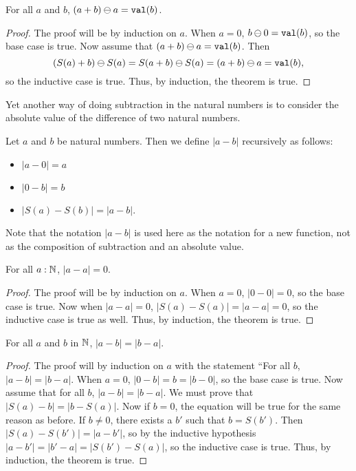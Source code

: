 \documentclass[../../math.tex]{subfiles}
\begin{document}
\begin{theorem} \label{nat_minus_plus}
    For all $a$ and $b$, $(a + b) \ominus a = \val b$.
\end{theorem}
\begin{proof}
    The proof will be by induction on $a$.  When $a = 0$, $b \ominus 0 = \val
    b$, so the base case is true.  Now assume that $(a + b) \ominus a = \val b$.
    Then
    \[
        (S(a) + b) \ominus S(a) = S(a + b) \ominus S(a) = (a + b) \ominus a =
        \val b,
    \]
    so the inductive case is true.  Thus, by induction, the theorem is true.
\end{proof}

Yet another way of doing subtraction in the natural numbers is to consider the
absolute value of the difference of two natural numbers.

\begin{definition}
    Let $a$ and $b$ be natural numbers.  Then we define $|a - b|$ recursively as
    follows:
    \begin{itemize}
        \item $|a - 0| = a$
        \item $|0 - b| = b$
        \item $|S(a) - S(b)| = |a - b|$.
    \end{itemize}
    Note that the notation $|a - b|$ is used here as the notation for a new
    function, not as the composition of subtraction and an absolute value.
\end{definition}

\begin{theorem}
    For all $a : \mathbb{N}$, $|a - a| = 0$.
\end{theorem}
\begin{proof}
    The proof will be by induction on $a$.  When $a = 0$, $|0 - 0| = 0$, so the
    base case is true.  Now when $|a - a| = 0$, $|S(a) - S(a)| = |a - a| = 0$,
    so the inductive case is true as well.  Thus, by induction, the theorem is
    true.
\end{proof}

\begin{theorem}
    For all $a$ and $b$ in $\mathbb{N}$, $|a - b| = |b - a|$.
\end{theorem}
\begin{proof}
    The proof will by induction on $a$ with the statement ``For all $b$, $|a -
    b| = |b - a|$.  When $a = 0$, $|0 - b| = b = |b - 0|$, so the base case is
    true.  Now assume that for all $b$, $|a - b| = |b - a|$.  We must prove that
    $|S(a) - b| = |b - S(a)|$.  Now if $b = 0$, the equation will be true for
    the same reason as before.  If $b \neq 0$, there exists a $b'$ such that $b
    = S(b')$.  Then $|S(a) - S(b')| = |a - b'|$, so by the inductive hypothesis
    $|a - b'| = |b' - a| = |S(b') - S(a)|$, so the inductive case is true.
    Thus, by induction, the theorem is true.
\end{proof}
\end{document}
